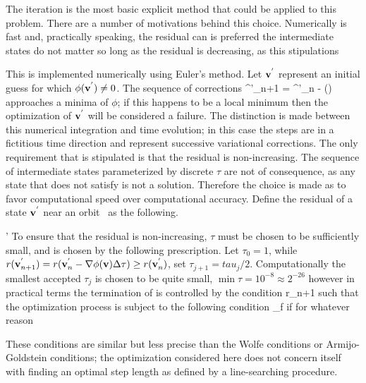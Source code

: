 The iteration  is the most basic explicit method that could be applied to this problem.
There are a number of motivations behind this choice. Numerically  is fast and,
practically speaking, the residual can is preferred the intermediate states do not matter so long as the
residual is decreasing, as this stipulations 

This is implemented numerically using Euler's method. Let $\mathbf{v}^{'}$ represent
an initial guess for which $\phi(\mathbf{v}^{'})\neq0$. The sequence of corrections
\beq {}
\statev^{'}_{n+1} = \statev^{'}_{n} - \nabla\phi(\statev)\Delta\tau
\eeq
approaches a minima of $\phi$; if this happens to be a local minimum then the optimization
of $\mathbf{v}^{'}$ will be considered a failure.
The distinction is made between this numerical integration and time evolution; in this case
the steps are in a fictitious time direction and represent successive variational corrections.
The only requirement that is stipulated is that the residual is non-increasing.
The sequence of intermediate states parameterized by discrete $\tau$ are not of consequence, as
any state that does not satisfy  is not a solution. Therefore the choice 
is made as to favor computational speed over computational accuracy.
Define the residual of a state $\mathbf{v}^{'}$ near an orbit \statev\ as the following.

'
To ensure that the residual
is non-increasing, $\tau$ must be chosen to be sufficiently small, and is chosen by the following prescription.
Let $\tau_0=1$, while $r(\mathbf{v}^{'}_{n+1}) = r(\mathbf{v}^{'}_{n} - \nabla\phi(\mathbf{v})\Delta\tau) \geq r(\mathbf{v}^{'}_{n})$,
set $\tau_{j+1} = tau_j / 2$. Computationally the smallest accepted $\tau_j$ is chosen to be quite small, $\min\tau = 10^{-8} \approx 2^{-26}$
however in practical terms the termination of  is controlled by the condition
\beq
r_{n+1}
\eeq
such that the optimization process is subject to the following condition
\beq {}
 \geq \epsilon_f
\eeq
if for whatever reason  



These conditions are similar but less precise than the Wolfe conditions or Armijo-Goldstein conditions; the optimization
considered here does not concern itself with finding an optimal step length as defined by a line-searching procedure.
